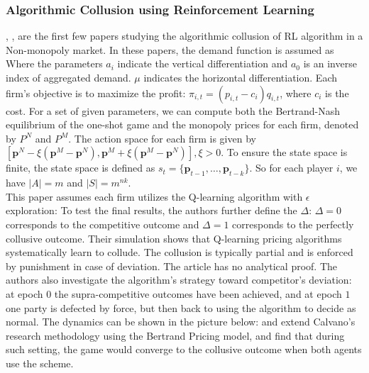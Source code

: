 \documentclass[12pt]{report}
\begin{document}
\subsubsection{Algorithmic Collusion using Reinforcement Learning}
\cite{calvano2019algorithmic}, \cite{calvano2020artificial}, \cite{calvano2020protecting} are the first few papers studying the algorithmic collusion of RL algorithm in a Non-monopoly market.
In these papers, the demand function is assumed as
Where the parameters $a_i$ indicate the vertical differentiation and $a_0$ is an inverse index of aggregated demand. $\mu$ indicates the
horizontal differentiation. Each firm's objective is to maximize the profit: $\pi_{i,t}=\left(p_{i,t}-c_{i}\right)q_{i,t}$, where $c_i$ is the cost.
For a set of given parameters, we can compute both the Bertrand-Nash equilibrium of the one-shot game and the monopoly prices for each firm, denoted by $P^N$ and $P^M$.
The action space for each firm is given by $\left[\mathbf{p}^N-\xi(\mathbf{p}^M-\mathbf{p}^N),\mathbf{p}^M+\xi(\mathbf{p}^M-\mathbf{p}^N)\right], \xi>0$.
To ensure the state space is finite, the state space is defined as $s_t=\{\mathbf{p}_{t-1},\ldots,\mathbf{p}_{t-k}\}$. So for each player $i$, we have $|A|=m$ and $|S|=m^{nk}$. \\
This paper assumes each firm utilizes the Q-learning algorithm with $\epsilon$ exploration:
To test the final results, the authors further define the  $\Delta$:
$\Delta=0$ corresponds to the competitive outcome and $\Delta=1$ corresponds to the perfectly collusive outcome. Their simulation shows that Q-learning pricing
algorithms systematically learn to collude. The collusion is typically partial and is enforced by punishment in case of deviation. The article has no analytical proof.
The authors also investigate the algorithm's strategy toward competitor's deviation: at epoch $0$ the supra-competitive outcomes have been achieved, and at epoch $1$ one party is defected by force, but then
back to using the algorithm to decide as normal. The dynamics can be shown in the picture below:
\cite{asker2022artificial} and \cite{asker2023impact} extend Calvano's research methodology using the Bertrand Pricing model, and find that during such setting, the game would converge to the collusive outcome when both agents use the  scheme.\\
\end{document}
